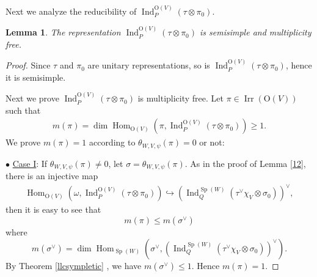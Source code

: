 \documentclass[article]{article}
\numberwithin{equation}{section}
\newtheorem{lemma}[theorem]{Lemma}
\theoremstyle{definition}
\DeclareMathOperator{\Hom}{Hom}
\DeclareMathOperator{\Ind}{Ind}
\DeclareMathOperator{\SP}{Sp}
\DeclareMathOperator{\Irr}{Irr}
\begin{document}
Next we analyze the reducibility of $\Ind_{P}^{\mathrm O(V)}(\tau\otimes \pi_0)$.
\begin{lemma}\label{multiplicityfree}
	The representation $\Ind_{P}^{\mathrm O(V)}(\tau\otimes \pi_0)$ is semisimple and multiplicity free. 
\end{lemma}
\begin{proof}
	Since $\tau$ and $\pi_{0}$ are unitary representations, so is $\Ind_{P}^{\mathrm O(V)}(\tau\otimes \pi_0)$, hence it is semisimple. 
	
	Next we prove $\Ind_{P}^{\mathrm O(V)}(\tau\otimes \pi_0)$ is multiplicity free. Let $\pi\in \Irr(\mathrm O(V))$ such that 
	\begin{align*}
	m(\pi)=\dim \Hom_{\mathrm O(V)}(\pi, \Ind_{P}^{\mathrm O(V)}(\tau\otimes \pi_0))\geq 1 .
	\end{align*}
	We prove $m(\pi)=1$ according to $\theta_{W,V,\psi}(\pi)=0$ or not: 

$\bullet$ \underline{Case I}: If $\theta_{W,V,\psi}(\pi)\neq 0$, let $\sigma=\theta_{ W,V,\psi}(\pi)$. As in the proof of Lemma \ref{12}, there is an injective map 
		\begin{align*}
		\Hom_{\mathrm O(V)}(\omega, \Ind_{P}^{\mathrm O(V)}(\tau\otimes \pi_0)) \hookrightarrow \left(\Ind_{Q}^{\SP(W)}(\tau^\vee\chi_{V}\otimes \sigma_{0})\right)^{\vee},
		\end{align*}
		then it is easy to see that 
		$$
		m(\pi) \leq m(\sigma^\vee) 
		$$
		where 
		$$
		m(\sigma^\vee) =  \dim \Hom_{\SP(W)}\left(\sigma^\vee, \left(\Ind_{Q}^{\SP(W)}(\tau^\vee\chi_{V}\otimes \sigma_{0})\right)^{\vee}\right). 
		$$
		By Theorem \ref{llcsympletic} , we have $m(\sigma^\vee) \leq 1$. Hence $m(\pi)=1$. 
		
		
		
		\begin{comment}
		Let $\Ind_{P}^{\mathrm O(V)}(\tau\otimes \pi_0)=\pi_1\oplus \pi_2\cdots \oplus \pi_l$, since $\theta_{V,W,\psi}(\pi)\neq 0$, $\Hom_{\mathrm O(V)}(\omega, \pi)$ is non-zero and isomorphic to $\sigma^\vee$ 
		So 
		\begin{align*}
		\oplus_{i} \Hom_{\mathrm O(V)}(\omega, m(\pi)\pi)_{\infty} &\hookrightarrow \Hom_{\mathrm O(V)}(\omega, \Ind_{P}^{\mathrm O(V)}(\tau\otimes \pi_0))_{\infty}\\
		&\hookrightarrow \Ind_{Q}^{\SP(W)}(\chi_{V}\tau\otimes \sigma_{0})^{\vee}
		\end{align*}
		By LLC (add) for symplectic groups, the multiplicity of $\sigma^\vee$ in $\Ind_{Q}^{\SP(W)}(\chi_{V}\tau\otimes \sigma_{0})^{\vee}$ is one, hence the multiplicity $m(\pi)$ is at most one. 
		\end{comment}
		

\end{proof}
\end{document}
